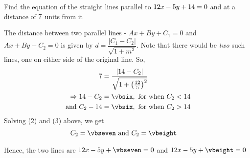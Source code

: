\question Find the equation of the straight lines parallel to $12 x - 5 y + 14 = 0$ 
and at a distance of $7$ units from it

\insertQR[-15pt]{}

\watchout

\ifprintanswers
\fi 

\begin{solution}
	The distance between two parallel lines - $Ax + By + C_1 = 0$ and $Ax+By+C_2 = 0$ is given by 
	$d = \dfrac{\vert C_1 - C_2 \vert}{\sqrt{1 + m^2}}$. Note that there would be \textit{two} such lines, 
	one on either side of the original line. So,
	\begin{align}
		\vbfour &= \dfrac{\vert \vbthree - C_2 \vert}{\sqrt{1 + \left( \frac{\vbone}{\vbtwo}\right)^2}} \\
		\Rightarrow \vbthree - C_2 &= \vbsix, \text{ for when } C_2 < \vbthree \\
		\text{ and } C_2 - \vbthree &= \vbsix, \text{ for when } C_2 > \vbthree
	\end{align}
	Solving (2) and (3) above, we get 
	\begin{align}
		C_2 &= \vbseven \text{ and } C_2 = \vbeight
	\end{align}
	
	Hence, the two lines are $\vbone x - \vbtwo y + \vbseven = 0$ and $\vbone x - \vbtwo y + \vbeight = 0$
\end{solution}
